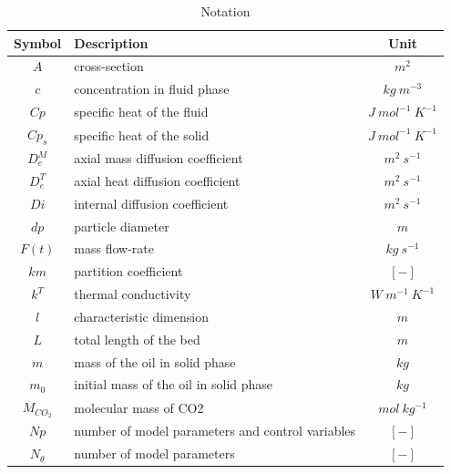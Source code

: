 \documentclass[a4paper,fleqn]{cas-dc}
\begin{document}
%

\iffalse
\newpage
\begin{table}[p]
		\caption{Notation}
		\label{tab::symbols}
		\begin{tabular}{ |c|l|c| } 
			\hline
			Symbol 		& 	Description 							& Unit 						\\ \hline
			$A$			&	cross-section							& $m^2$ 					\\ \hline
			$c$			&	concentration in fluid phase			& $kg ~ m^{-3}$				\\ \hline
			$Cp$		&	specific heat of the fluid				& $J ~ mol^{-1} ~ K^{-1}$ 	\\ \hline
			$Cp_s$		&	specific heat of the solid				& $J ~ mol^{-1} ~ K^{-1}$ 	\\ \hline
			$D_e^M$		&	axial mass diffusion coefficient		& $m^2 ~ s^{-1}$			\\ \hline
			$D_e^T$		&	axial heat diffusion coefficient		& $m^2 ~ s^{-1}$			\\ \hline
			$Di$		&	internal diffusion coefficient			& $m^2 ~ s^{-1}$			\\ \hline
			$dp$		&	particle diameter						& $m$						\\ \hline
			$F(t)$		&	mass flow-rate							& $kg ~ s^{-1}$				\\ \hline
			$km$		&	partition coefficient					& $[-]$						\\ \hline
			$k^T$		&	thermal conductivity					& $W ~ m^{-1} ~ K^{-1}$		\\ \hline
			$l$			&	characteristic dimension				& $m$						\\ \hline
			$L$			&	total length of the bed					& $m$						\\ \hline
			$m$			&	mass of the oil in solid phase			& $kg$						\\ \hline
			$m_0$		&	initial mass of the oil in solid phase	& $kg$						\\ \hline
			$M_{CO_2}$	&	molecular mass of CO2					& $mol ~ kg^{-1}$			\\ \hline
			$Np$		&	number of model parameters and control variables & $[-]$			\\ \hline
			$N_{\theta}$&	number of model parameters				& $[-]$						\\ \hline

\end{tabular}
\end{table}
\end{document}
